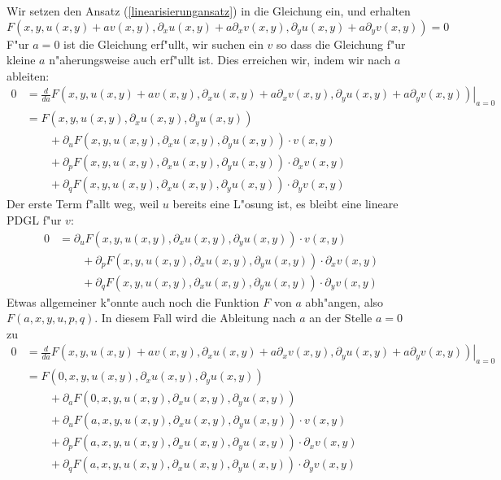 Wir setzen den Ansatz (\ref{linearisierungansatz}) in die Gleichung
ein, und erhalten
\[
F(x,y,u(x,y)+av(x,y),\partial_xu(x,y)+a\partial_xv(x,y),
\partial_yu(x,y)+a\partial_yv(x,y))=0
\]
F"ur $a=0$ ist die Gleichung erf"ullt, wir suchen ein $v$ so dass die Gleichung
f"ur kleine $a$ n"aherungsweise auch erf"ullt ist. Dies erreichen wir,
indem wir nach $a$ ableiten:
\begin{align*}
0&=
\left.\frac{d}{da}
F(x,y,u(x,y)+av(x,y),\partial_xu(x,y)+a\partial_xv(x,y),
\partial_yu(x,y)+a\partial_yv(x,y))\right|_{a=0}
\\
&=F(x,y,u(x,y),\partial_xu(x,y),\partial_yu(x,y))
\\
&\qquad
+
\partial_uF(x,y,u(x,y),\partial_xu(x,y),\partial_yu(x,y))\cdot v(x,y)
\\
&\qquad
+
\partial_pF(x,y,u(x,y),\partial_xu(x,y),\partial_yu(x,y))\cdot \partial_xv(x,y)
\\
&\qquad
+
\partial_qF(x,y,u(x,y),\partial_xu(x,y),\partial_yu(x,y))\cdot \partial_yv(x,y)
\end{align*}
Der erste Term f"allt weg, weil $u$ bereits eine L"osung ist,
es bleibt eine lineare PDGL f"ur $v$:
\begin{align*}
0&=
\partial_uF(x,y,u(x,y),\partial_xu(x,y),\partial_yu(x,y))\cdot v(x,y)
\\
&\qquad
+
\partial_pF(x,y,u(x,y),\partial_xu(x,y),\partial_yu(x,y))\cdot \partial_xv(x,y)
\\
&\qquad
+
\partial_qF(x,y,u(x,y),\partial_xu(x,y),\partial_yu(x,y))\cdot \partial_yv(x,y)
\end{align*}
Etwas allgemeiner k"onnte auch noch die Funktion $F$ von $a$ abh"angen,
also $F(a,x,y,u,p,q)$. In diesem Fall wird die Ableitung nach $a$ an
der Stelle $a=0$ zu
\begin{align*}
0&=
\left.\frac{d}{da}
F(x,y,u(x,y)+av(x,y),\partial_xu(x,y)+a\partial_xv(x,y),
\partial_yu(x,y)+a\partial_yv(x,y))\right|_{a=0}
\\
&=
F(0,x,y,u(x,y),\partial_xu(x,y),\partial_yu(x,y))
\\
&\qquad
+\partial_aF(0,x,y,u(x,y),\partial_xu(x,y),\partial_yu(x,y))
\\
&\qquad
+
\partial_uF(a,x,y,u(x,y),\partial_xu(x,y),\partial_yu(x,y))\cdot v(x,y)
\\
&\qquad
+
\partial_pF(a,x,y,u(x,y),\partial_xu(x,y),\partial_yu(x,y))\cdot \partial_xv(x,y)
\\
&\qquad
+
\partial_qF(a,x,y,u(x,y),\partial_xu(x,y),\partial_yu(x,y))\cdot \partial_yv(x,y)
\end{align*}
